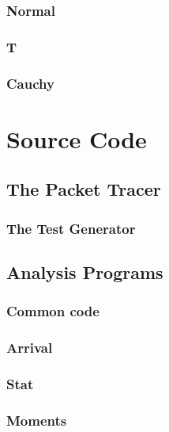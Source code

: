 \subsection{Normal}
\subsection{T}
\subsection{Cauchy}

\chapter{Source Code}

\section{The Packet Tracer}

\subsection{The Test Generator}

\section{Analysis Programs}

\subsection{Common code}

\subsection{Arrival}

\subsection{Stat}

\subsection{Moments}
